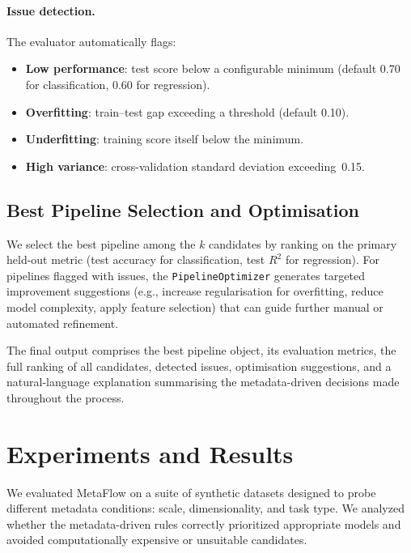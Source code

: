 \documentclass[conference]{IEEEtran}
\begin{document}
   \paragraph{Issue detection.}
   The evaluator automatically flags:
   \begin{itemize}
   \item \textbf{Low performance}: test score below a configurable minimum (default 0.70 for classification, 0.60 for regression).
   \item \textbf{Overfitting}: train--test gap exceeding a threshold (default 0.10).
   \item \textbf{Underfitting}: training score itself below the minimum.
   \item \textbf{High variance}: cross-validation standard deviation exceeding~0.15.
   \end{itemize}

   \subsection{Best Pipeline Selection and Optimisation}
   \label{sec:best_selection}

   We select the best pipeline among the $k$ candidates by ranking on the primary held-out metric (test accuracy for classification, test $R^2$ for regression).
   For pipelines flagged with issues, the \texttt{PipelineOptimizer} generates targeted improvement suggestions (e.g., increase regularisation for overfitting, reduce model complexity, apply feature selection) that can guide further manual or automated refinement.

   The final output comprises the best pipeline object, its evaluation metrics, the full ranking of all candidates, detected issues, optimisation suggestions, and a natural-language explanation summarising the metadata-driven decisions made throughout the process.

   \section{Experiments and Results}
   \label{sec:experiments}

   We evaluated MetaFlow on a suite of synthetic datasets designed to probe different metadata conditions: scale, dimensionality, and task type. We analyzed whether the metadata-driven rules correctly prioritized appropriate models and avoided computationally expensive or unsuitable candidates.
\end{document}
